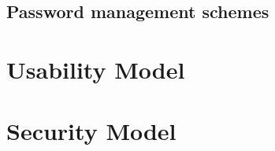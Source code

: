 \subsection{Password management schemes}


\section{Usability Model}\label{sec:usability-model}

\cite{naturally-rehearsing}


\section{Security Model}

\cite{naturally-rehearsing}











